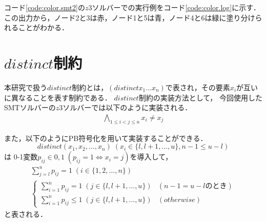 コード\ref{code:color.smt2}の$z3ソルバー$での実行例をコード\ref{code:color.log}に示す．
この出力から，ノード2と3は赤，ノード1と5は青，ノード4と6は緑に塗り分けられることがわかる．






\section{$distinct$制約}


本研究で扱う$distinct$制約とは，$(distinct x_1 ... x_n)$で表され，その要素$x_i$が互いに異なることを表す制約である．
$distinct$制約の実装方法として，
今回使用したSMTソルバーの$z3ソルバー$では以下のように実装される．
\begin{eqnarray*}
    \bigwedge_{1 \leq i < j \leq n} x_i \neq x_j
\end{eqnarray*}

また，以下のようにPB符号化を用いて実装することができる．
\\
$$distinct(x_1, x_2,\ldots, x_n) \; (x_i \in \{l,l+1,\ldots,u\}, n-1 \leq u-l)$$
は
0-1変数$p_{ij} \in {0,1} \; (p_{ij}=1 \Leftrightarrow x_i=j)$を導入して，
\begin{eqnarray}
    \sum_{j=l}^{u} p_{ij}=1 \; (i \in \{1,2,\ldots,n\}) \label{eq:smt_pb_1}\\
    \begin{cases}
        \sum_{i=1}^{n} p_{ij} = 1 \; (j \in \{l,l+1,\ldots,u\}) & (n-1=u-lのとき) \\
        \sum_{i=1}^{n} p_{ij} \leq 1 \; (j \in \{l,l+1,\ldots,u\}) & (otherwise)
    \end{cases}\label{eq:smt_pb_2}
\end{eqnarray}
と表される．

